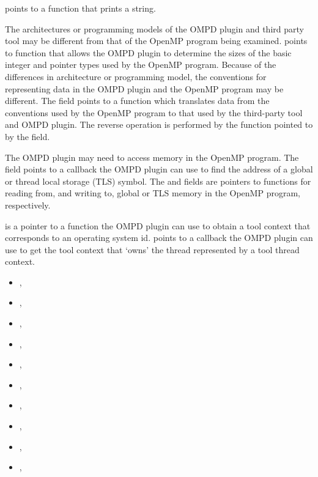  points to a function that prints a string.

The architectures or programming models of the OMPD plugin and
third party tool may be different from that of the OpenMP
program being examined.
 points to function that allows
the OMPD plugin to determine the sizes of the basic integer
and pointer types used by the OpenMP program.
Because of the differences in architecture or programming model,
the conventions for representing data in the OMPD plugin and
the OpenMP program may be different.
The  field points to a function which translates
data from the conventions used by the OpenMP program to that used
by the third-party tool and OMPD plugin.
The reverse operation is performed by the function pointed
to by the  field.

The OMPD plugin may need to access memory in the OpenMP program.
The  field points to a callback the
OMPD plugin can use to find the address of a global or thread
local storage (TLS) symbol.
The  and  fields are
pointers to functions for reading from, and writing to, global or TLS
memory in the OpenMP program, respectively.

 is a pointer to a function
the OMPD plugin can use to obtain a tool context that corresponds to
an operating system id.
 points to a callback
the OMPD plugin can use to get the tool context that `owns' the
thread represented by a tool thread context.

\crossreferences
\begin{itemize}
\item
  , 
\item
  , 
\item
  , 
\item
  , 
\item
  , 
\item
  , 
\item
  , 
\item
  , 
\item
  , 
\item
  , 
\end{itemize}

